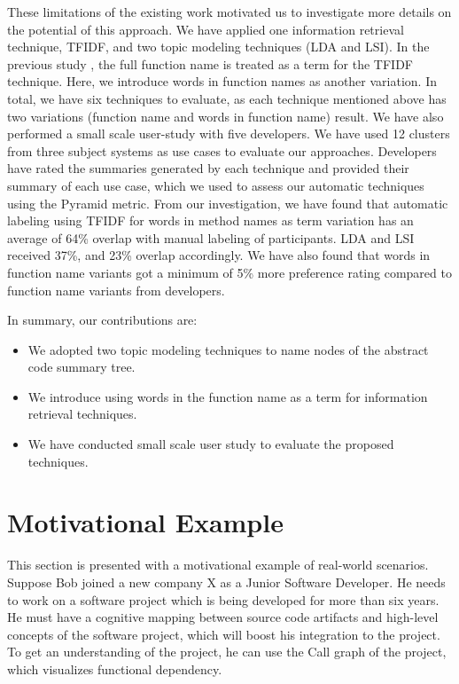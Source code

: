 These limitations of the existing work motivated us to investigate more details on the potential of this approach. We have applied one information retrieval technique, TFIDF, and two topic modeling techniques (LDA and LSI). In the previous study \cite{gharibi2018automaticStaticCluster}, the full function name is treated as a term for the TFIDF technique. Here, we introduce words in function names as another variation. In total, we have six techniques to evaluate, as each technique mentioned above has two variations (function name and words in function name) result. We have also performed a small scale user-study with five developers. We have used 12 clusters from three subject systems as use cases to evaluate our approaches. Developers have rated the summaries generated by each technique and provided their summary of each use case, which we used to assess our automatic techniques using the Pyramid metric. From our investigation, we have found that automatic labeling using TFIDF for words in method names as term variation has an average of 64\% overlap with manual labeling of participants. LDA and LSI received 37\%, and 23\% overlap accordingly. We have also found that words in function name variants got a minimum of 5\% more preference rating compared to function name variants from developers. 

In summary, our contributions are:
\begin{itemize}
  \item We adopted two topic modeling techniques to name nodes of the abstract code summary tree. 
  \item We introduce using words in the function name as a term for information retrieval techniques.
  \item We have conducted small scale user study to evaluate the proposed techniques.
\end{itemize}



\section{Motivational Example}
\label{hla1:motivation}

This section is presented with a motivational example of real-world scenarios. Suppose Bob joined a new company X as a Junior Software Developer. He needs to work on a software project which is being developed for more than six years. He must have a cognitive mapping between source code artifacts and high-level concepts of the software project, which will boost his integration to the project. To get an understanding of the project, he can use the Call graph of the project, which visualizes functional dependency.

